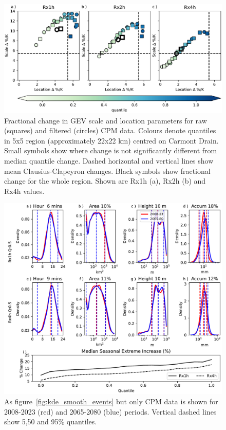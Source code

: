 \documentclass[11pt,a4paper]{article}
\begin{document}
\begin{figure}[ht!]
	\centering
	\includegraphics[width=\linewidth]{carmont_gev_quant_change}
	\caption{
		Fractional change in GEV scale  and location parameters for raw (squares) and filtered (circles) CPM data. 
				Colours denote quantiles in 5x5 region (approximately 22x22 km) centred on Carmont Drain. 
				Small symbols show where change is not significantly different from median quantile change.
				Dashed horizontal and vertical lines show mean Clausius-Clapeyron changes.
				Black symbols show fractional change for the whole region.  
				Shown are Rx1h (a), Rx2h (b) and Rx4h values.
	}
	\label{fig:carmont_gev_quant_change}
\end{figure}
\clearpage
\begin{figure}[h!]
	\centering
	\includegraphics[width=\linewidth]{kde_smooth_events_2065_2080}
	\caption{As figure~\ref{fig:kde_smooth_events} but only CPM data is shown for 2008-2023 (red) and 2065-2080 (blue) periods. Vertical dashed lines show 5,50 and 95\% quantiles. }
	\label{fig:kde_smooth_events_2065_2080}
\end{figure}
\end{document}
